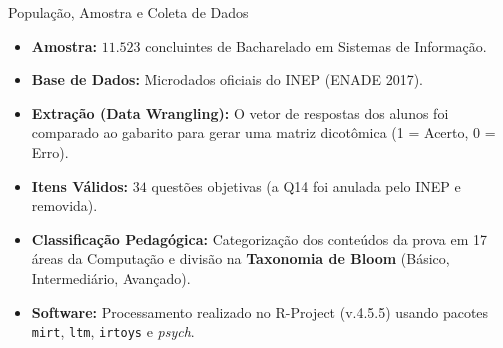 \documentclass[10pt, aspectratio=169]{beamer}
\begin{document}
\begin{frame}{População, Amostra e Coleta de Dados}
    \begin{itemize}
        \item \textbf{Amostra:} $11.523$ concluintes de Bacharelado em Sistemas de Informação.
        \item \textbf{Base de Dados:} Microdados oficiais do INEP (ENADE 2017).
        \item \textbf{Extração (Data Wrangling):} O vetor de respostas dos alunos foi comparado ao gabarito para gerar uma matriz dicotômica (1 = Acerto, 0 = Erro).
        \item \textbf{Itens Válidos:} $34$ questões objetivas (a Q14 foi anulada pelo INEP e removida).
        \item \textbf{Classificação Pedagógica:} Categorização dos conteúdos da prova em 17 áreas da Computação e divisão na \textbf{Taxonomia de Bloom} (Básico, Intermediário, Avançado).
        \item \textbf{Software:} Processamento realizado no R-Project (v.4.5.5) usando pacotes \texttt{mirt}, \texttt{ltm}, \texttt{irtoys} e \textit{psych}.
    \end{itemize}
\end{frame}
\end{document}
